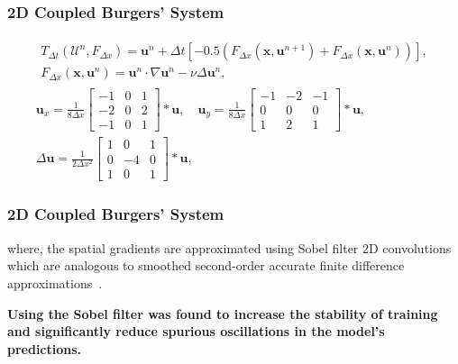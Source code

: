 \documentclass{beamer}
\theoremstyle{remark}
\newcommand{\viscosity}{\nu}
\begin{document}
\begin{frame}
\frametitle{2D Coupled Burgers' System}
\begin{gather}
    \begin{gathered}
    T_{\Delta t}(\bm{\mathcal{U}}^{n}, F_{\Delta x}) = \bm{u}^{n} + \Delta t \left[-0.5\left(F_{\Delta x}(\bm{x}, \bm{u}^{n+1}) + F_{\Delta x}(\bm{x}, \bm{u}^{n})\right)\right],\\
    F_{\Delta x}(\bm{x}, \bm{u}^{n}) = \bm{u}^{n}\cdot \nabla \bm{u}^{n} - \viscosity \Delta \bm{u}^{n},
    \end{gathered}\\
    \bm{u}_{x}=\frac{1}{8\Delta x}\begin{bmatrix} 
    -1 & 0 & 1 \\
    -2 & 0 & 2 \\
    -1 & 0 & 1
    \end{bmatrix}\ast \bm{u}, \quad 
    \bm{u}_{y}=\frac{1}{8\Delta x}\begin{bmatrix} 
        -1 & -2 & -1 \\
        0 & 0 & 0 \\
        1 & 2 & 1
    \end{bmatrix}\ast \bm{u}, \\
    \Delta \bm{u}=\frac{1}{2\Delta x^{2}}\begin{bmatrix} 
        1 & 0 & 1 \\
        0 & -4 & 0 \\
        1 & 0 & 1
    \end{bmatrix}\ast \bm{u},
\end{gather}
\end{frame}


\begin{frame}
\frametitle{2D Coupled Burgers' System}

where,
 the spatial gradients are approximated using Sobel filter 2D convolutions which are analogous to smoothed second-order accurate finite difference approximations~\cite{sobel19683x3}.

\textbf{Using the Sobel filter was found to increase the stability of training and significantly reduce spurious oscillations in the model's predictions.}
\end{frame}
\end{document}
